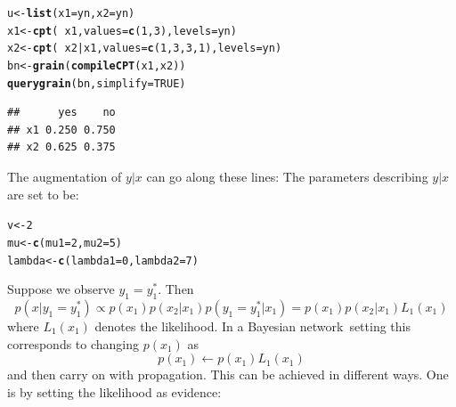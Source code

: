 \documentclass[10pt]{article}\usepackage[]{graphicx}\usepackage[]{xcolor}
\makeatletter
\newcommand{\hlnum}[1]{\textcolor[rgb]{0.686,0.059,0.569}{#1}}%
\newcommand{\hlopt}[1]{\textcolor[rgb]{0,0,0}{#1}}%
\newcommand{\hlstd}[1]{\textcolor[rgb]{0.345,0.345,0.345}{#1}}%
\newcommand{\hlkwb}[1]{\textcolor[rgb]{0.69,0.353,0.396}{#1}}%
\newcommand{\hlkwc}[1]{\textcolor[rgb]{0.333,0.667,0.333}{#1}}%
\newcommand{\hlkwd}[1]{\textcolor[rgb]{0.737,0.353,0.396}{\textbf{#1}}}%
\newenvironment{kframe}{%
 \def\at@end@of@kframe{}%
 \ifinner\ifhmode%
  \def\at@end@of@kframe{\end{minipage}}%
  \begin{minipage}{\columnwidth}%
 \fi\fi%
 \def\FrameCommand##1{\hskip\@totalleftmargin \hskip-\fboxsep
 \colorbox{shadecolor}{##1}\hskip-\fboxsep
     \hskip-\linewidth \hskip-\@totalleftmargin \hskip\columnwidth}%
 \MakeFramed {\advance\hsize-\width
   \@totalleftmargin\z@ \linewidth\hsize
   \@setminipage}}%
 {\par\unskip\endMakeFramed%
 \at@end@of@kframe}
\newenvironment{knitrout}{}{} %
\def\bn{Bayesian network}
\makeatother
\begin{document}
\begin{knitrout}
\color{fgcolor}\begin{kframe}
\begin{alltt}
\hlstd{u} \hlkwb{<-} \hlkwd{list}\hlstd{(}\hlkwc{x1}\hlstd{=yn,} \hlkwc{x2}\hlstd{=yn)}
\hlstd{x1} \hlkwb{<-} \hlkwd{cpt}\hlstd{(}\hlopt{~}\hlstd{x1,} \hlkwc{values}\hlstd{=}\hlkwd{c}\hlstd{(}\hlnum{1}\hlstd{,} \hlnum{3}\hlstd{),} \hlkwc{levels}\hlstd{=yn)}
\hlstd{x2} \hlkwb{<-} \hlkwd{cpt}\hlstd{(}\hlopt{~}\hlstd{x2}\hlopt{|}\hlstd{x1,} \hlkwc{values}\hlstd{=}\hlkwd{c}\hlstd{(}\hlnum{1}\hlstd{,} \hlnum{3}\hlstd{,} \hlnum{3}\hlstd{,} \hlnum{1}\hlstd{),} \hlkwc{levels}\hlstd{=yn)}
\hlstd{bn} \hlkwb{<-} \hlkwd{grain}\hlstd{(}\hlkwd{compileCPT}\hlstd{(x1, x2))}
\hlkwd{querygrain}\hlstd{(bn,} \hlkwc{simplify}\hlstd{=}\hlnum{TRUE}\hlstd{)}
\end{alltt}
\begin{verbatim}
##      yes    no
## x1 0.250 0.750
## x2 0.625 0.375
\end{verbatim}
\end{kframe}
\end{knitrout}

The augmentation of $y|x$ can go along these lines: The parameters describing $y|x$ are set to be:
\begin{knitrout}
\color{fgcolor}\begin{kframe}
\begin{alltt}
\hlstd{v} \hlkwb{<-} \hlnum{2}
\hlstd{mu} \hlkwb{<-} \hlkwd{c}\hlstd{(}\hlkwc{mu1}\hlstd{=}\hlnum{2}\hlstd{,} \hlkwc{mu2}\hlstd{=}\hlnum{5}\hlstd{)}
\hlstd{lambda} \hlkwb{<-} \hlkwd{c}\hlstd{(}\hlkwc{lambda1}\hlstd{=}\hlnum{0}\hlstd{,} \hlkwc{lambda2}\hlstd{=}\hlnum{7}\hlstd{)}
\end{alltt}
\end{kframe}
\end{knitrout}

Suppose we observe $y_1 = y_1^*$. Then
\begin{displaymath}
  p(x|y_1= y_1^*)\propto p(x_1)p(x_2|x_1) p(y_1=y_1^*|x_1) =  p(x_1)p(x_2|x_1) L_1(x_1)
\end{displaymath}
where $L_1(x_1)$ denotes the likelihood. In a \bn\ setting this
corresponds to changing $p(x_1)$ as
\begin{displaymath}
  p(x_1) \leftarrow p(x_1)L_1(x_1)
\end{displaymath}
and then carry on with propagation. This can be achieved in different ways. One is by setting the likelihood as evidence:
\end{document}

